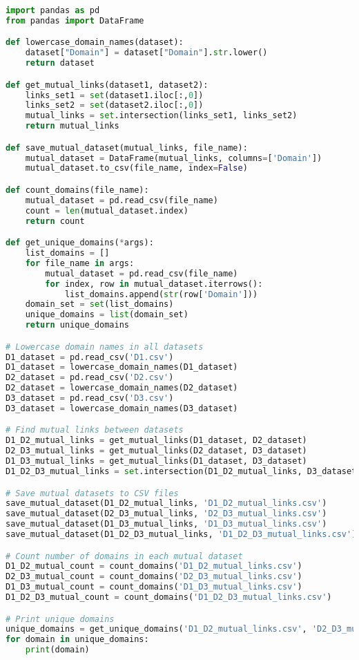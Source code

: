 \documentclass[12pt]{article}
\begin{document}
\begin{lstlisting}[language=Python, caption=Generate a graph for various cluster sizes.] 
import pandas as pd
from pandas import DataFrame

def lowercase_domain_names(dataset):
    dataset["Domain"] = dataset["Domain"].str.lower()
    return dataset

def get_mutual_links(dataset1, dataset2):
    links_set1 = set(dataset1.iloc[:,0])
    links_set2 = set(dataset2.iloc[:,0])
    mutual_links = set.intersection(links_set1, links_set2)
    return mutual_links

def save_mutual_dataset(mutual_links, file_name):
    mutual_dataset = DataFrame(mutual_links, columns=['Domain'])
    mutual_dataset.to_csv(file_name, index=False)

def count_domains(file_name):
    mutual_dataset = pd.read_csv(file_name)
    count = len(mutual_dataset.index)
    return count

def get_unique_domains(*args):
    list_domains = []
    for file_name in args:
        mutual_dataset = pd.read_csv(file_name)
        for index, row in mutual_dataset.iterrows():
            list_domains.append(str(row['Domain']))
    domain_set = set(list_domains)
    unique_domains = list(domain_set)
    return unique_domains

# Lowercase domain names in all datasets
D1_dataset = pd.read_csv('D1.csv')
D1_dataset = lowercase_domain_names(D1_dataset)
D2_dataset = pd.read_csv('D2.csv')
D2_dataset = lowercase_domain_names(D2_dataset)
D3_dataset = pd.read_csv('D3.csv')
D3_dataset = lowercase_domain_names(D3_dataset)

# Find mutual links between datasets
D1_D2_mutual_links = get_mutual_links(D1_dataset, D2_dataset)
D2_D3_mutual_links = get_mutual_links(D2_dataset, D3_dataset)
D1_D3_mutual_links = get_mutual_links(D1_dataset, D3_dataset)
D1_D2_D3_mutual_links = set.intersection(D1_D2_mutual_links, D3_dataset.iloc[:,0])

# Save mutual datasets to CSV files
save_mutual_dataset(D1_D2_mutual_links, 'D1_D2_mutual_links.csv')
save_mutual_dataset(D2_D3_mutual_links, 'D2_D3_mutual_links.csv')
save_mutual_dataset(D1_D3_mutual_links, 'D1_D3_mutual_links.csv')
save_mutual_dataset(D1_D2_D3_mutual_links, 'D1_D2_D3_mutual_links.csv')

# Count number of domains in each mutual dataset
D1_D2_mutual_count = count_domains('D1_D2_mutual_links.csv')
D2_D3_mutual_count = count_domains('D2_D3_mutual_links.csv')
D1_D3_mutual_count = count_domains('D1_D3_mutual_links.csv')
D1_D2_D3_mutual_count = count_domains('D1_D2_D3_mutual_links.csv')

# Print unique domains
unique_domains = get_unique_domains('D1_D2_mutual_links.csv', 'D2_D3_mutual_links.csv', 'D1_D3_mutual_links.csv', 'D1_D2_D3_mutual_links.csv')
for domain in unique_domains:
    print(domain)

\end{lstlisting}
\end{document}
